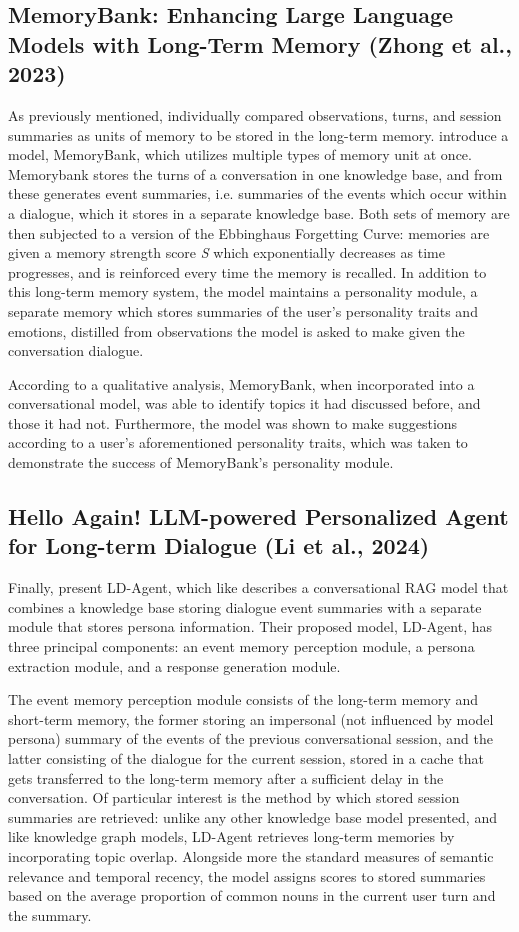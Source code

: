 	
\subsection{MemoryBank: Enhancing Large Language Models with Long-Term Memory (Zhong et al., 2023)}
		
As previously mentioned, \cite{Maharana2024} individually compared observations, turns, and session summaries as units of memory to be stored in the long-term memory. \cite{Zhong2023} introduce a model, MemoryBank, which utilizes multiple types of memory unit at once. Memorybank stores the turns of a conversation in one knowledge base, and from these generates event summaries, i.e. summaries of the events which occur within a dialogue, which it stores in a separate knowledge base. Both sets of memory are then subjected to a version of the Ebbinghaus Forgetting Curve: memories are given a memory strength score \textit{S} which exponentially decreases as time progresses, and is reinforced every time the memory is recalled. In addition to this long-term memory system, the model maintains a personality module, a separate memory which stores summaries of the user's personality traits and emotions, distilled from observations the model is asked to make given the conversation dialogue. 
	
According to a qualitative analysis, MemoryBank, when incorporated into a conversational model, was able to identify topics it had discussed before, and those it had not. Furthermore, the model was shown to make suggestions according to a user's aforementioned personality traits, which was taken to demonstrate the success of MemoryBank's personality module.


\subsection{Hello Again! LLM-powered Personalized Agent for Long-term Dialogue (Li et al., 2024)}

Finally, \cite{Li2024} present LD-Agent, which like \cite{Zhong2023} describes a conversational RAG model that combines a knowledge base storing dialogue event summaries with a separate module that stores persona information. Their proposed model, LD-Agent, has three principal components: an event memory perception module, a persona extraction module, and a response generation module. 
	
The event memory perception module consists of the long-term memory and short-term memory, the former storing an impersonal (not influenced by model persona) summary of the events of the previous conversational session, and the latter consisting of the dialogue for the current session, stored in a cache that gets transferred to the long-term memory after a sufficient delay in the conversation. Of particular interest is the method by which stored session summaries are retrieved: unlike any other knowledge base model presented, and like knowledge graph models, LD-Agent retrieves long-term memories by incorporating topic overlap. Alongside more the standard measures of semantic relevance and temporal recency, the model assigns scores to stored summaries based on the average proportion of common nouns in the current user turn and the summary.

